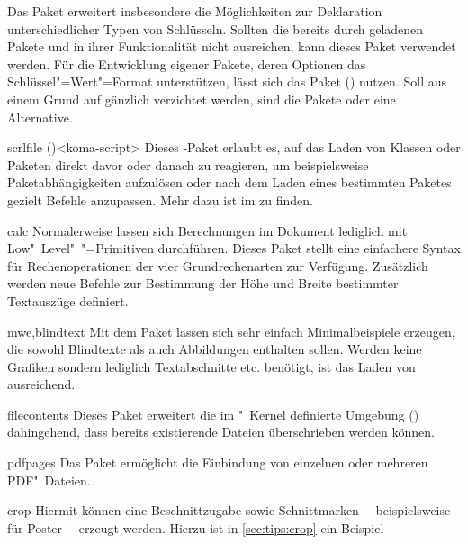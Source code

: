 \begin{packages}
  Das Paket  erweitert insbesondere die Möglichkeiten zur 
  Deklaration unterschiedlicher Typen von Schlüsseln. Sollten die bereits durch 
  \TUDScript geladenen Pakete  und  in ihrer 
  Funktionalität nicht ausreichen, kann dieses Paket verwendet werden. Für die 
  Entwicklung eigener Pakete, deren Optionen das Schlüssel"=Wert"=Format 
  unterstützen, lässt sich das Paket ()  
  nutzen. Soll aus einem Grund auf \KOMAScript gänzlich verzichtet werden, 
  sind die Pakete  oder  eine Alternative.
\item[scrlfile]()<koma-script>
  Dieses \KOMAScript-Paket erlaubt es, auf das Laden von Klassen oder Paketen 
  direkt davor oder danach zu reagieren, um beispielsweise Paketabhängigkeiten 
  aufzulösen oder nach dem Laden eines bestimmten Paketes gezielt Befehle 
  anzupassen. Mehr dazu ist im \scrguide zu finden.
\item[calc]
  Normalerweise lassen sich Berechnungen im Dokument lediglich mit 
  Low"~Level"~"=Primitiven durchführen. Dieses Paket stellt eine 
  einfachere Syntax für Rechenoperationen der vier Grundrechenarten zur 
  Verfügung. Zusätzlich werden neue Befehle zur Bestimmung der Höhe und Breite 
  bestimmter Textauszüge definiert.
\item[mwe,blindtext]
  Mit dem Paket  lassen sich sehr einfach Minimalbeispiele 
  erzeugen, die sowohl Blindtexte als auch Abbildungen enthalten sollen. Werden 
  keine Grafiken sondern lediglich Textabschnitte etc. benötigt, ist das Laden 
  von  ausreichend.
\item[filecontents]
  Dieses Paket erweitert die im "~Kernel definierte Umgebung 
  () dahingehend, dass bereits 
  existierende Dateien überschrieben werden können.
\item[pdfpages]
  Das Paket ermöglicht die Einbindung von einzelnen oder mehreren PDF"~Dateien.
\item[crop]
  Hiermit können eine Beschnittzugabe sowie Schnittmarken~-- beispielsweise für 
  Poster~-- erzeugt werden. Hierzu ist in \autoref{sec:tips:crop} ein Beispiel 

\end{packages}
